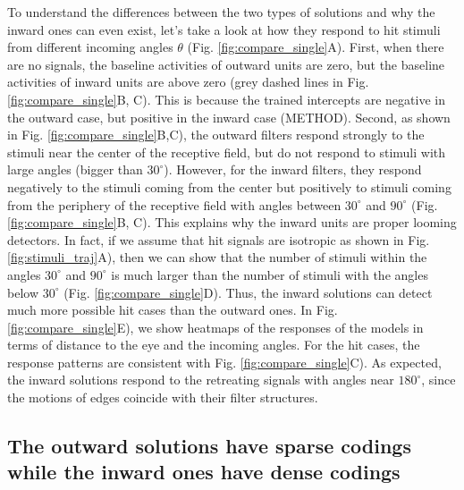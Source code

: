 \documentclass[9pt,lineno]{elife}
\begin{document}
To understand the differences between the two types of solutions and why the inward ones can even exist, let's take a look at how they respond to hit stimuli from different incoming angles $\theta$ (Fig. \ref{fig:compare_single}A). First, when there are no signals, the baseline activities of outward units are zero, but the baseline activities of inward units are above zero (grey dashed lines in Fig. \ref{fig:compare_single}B, C). This is because the trained intercepts are negative in the outward case, but positive in the inward case (METHOD). Second, as shown in Fig. \ref{fig:compare_single}B,C), the outward filters respond strongly to the stimuli near the center of the receptive field, but do not respond to stimuli with large angles (bigger than $30^{\circ}$). However, for the inward filters, they respond negatively to the stimuli coming from the center but positively to stimuli coming from the periphery of the receptive field with angles between $30^{\circ}$ and $90^{\circ}$ (Fig. \ref{fig:compare_single}B, C). This explains why the inward units are proper looming detectors. In fact, if we assume that hit signals are isotropic as shown in Fig. \ref{fig:stimuli_traj}A), then we can show that the number of stimuli within the angles $30^{\circ}$ and $90^{\circ}$ is much larger than the number of stimuli with the angles below $30^{\circ}$ (Fig. \ref{fig:compare_single}D). Thus, the inward solutions can detect much more possible hit cases than the outward ones. In Fig. \ref{fig:compare_single}E), we show heatmaps of the responses of the models in terms of distance to the eye and the incoming angles. For the hit cases, the response patterns are consistent with Fig. \ref{fig:compare_single}C). As expected, the inward solutions respond to the retreating signals with angles near $180^{\circ}$, since the motions of edges coincide with their filter structures.

\subsection{The outward solutions have sparse codings while the inward ones have dense codings}



\end{document}
